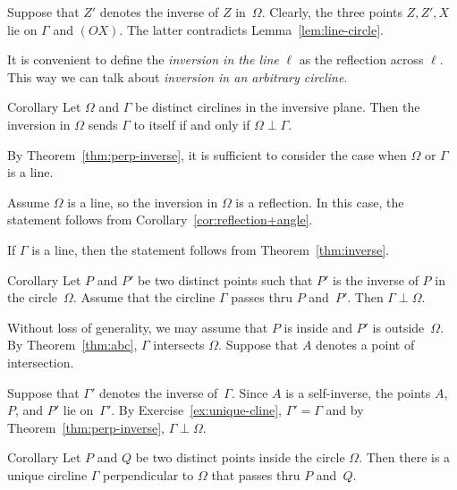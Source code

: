 Suppose that $Z'$ denotes the inverse of $Z$ in~$\Omega$.
Clearly, the three points $Z, Z', X$ lie on $\Gamma$ and $(OX)$.
The latter  contradicts Lemma~\ref{lem:line-circle}.
\qeds 

It is convenient to define the 
\emph{inversion in the line} $\ell$
as the reflection across $\ell$.
This way we can talk about \emph{inversion in an arbitrary circline}.

\begin{thm}{Corollary}\label{cor:perp-inverse-clines}
Let $\Omega$  and $\Gamma$ be distinct circlines in the inversive plane.
Then
the inversion in $\Omega$ sends $\Gamma$ to itself if and only if $\Omega\perp\Gamma$.
\end{thm}

By Theorem~\ref{thm:perp-inverse}, it is sufficient to consider the case when $\Omega$ or $\Gamma$ is a line.

Assume $\Omega$ is a line, so the inversion in $\Omega$ is a reflection.
In this case, the statement follows from Corollary~\ref{cor:reflection+angle}.

If $\Gamma$ is a line, 
then the statement follows from Theorem~\ref{thm:inverse}.
\qeds

\begin{thm}{Corollary}\label{cor:perp-inverse}
Let $P$ and $P'$ be two distinct points
such that $P'$ is the inverse of $P$ in the circle~$\Omega$.
Assume that the circline $\Gamma$ passes thru $P$ and~$P'$.
Then $\Gamma\perp\Omega$.
\end{thm}

Without loss of generality, we may assume that $P$ is inside and $P'$ is outside~$\Omega$.
By Theorem~\ref{thm:abc}, $\Gamma$ intersects $\Omega$.
Suppose that $A$ denotes a point of intersection.

Suppose that $\Gamma'$ denotes the inverse of~$\Gamma$.
Since $A$ is a self-inverse, the points $A$, $P$, and $P'$ lie on~$\Gamma'$.
By Exercise~\ref{ex:unique-cline},
$\Gamma'=\Gamma$
and by Theorem~\ref{thm:perp-inverse}, $\Gamma\perp\Omega$.
\qeds

\begin{thm}{Corollary}\label{cor:h-line} 
Let $P$ and $Q$ be two distinct points inside the circle $\Omega$.
Then there is a unique circline $\Gamma$ perpendicular to $\Omega$ that passes thru $P$ and~$Q$.  
\end{thm}

